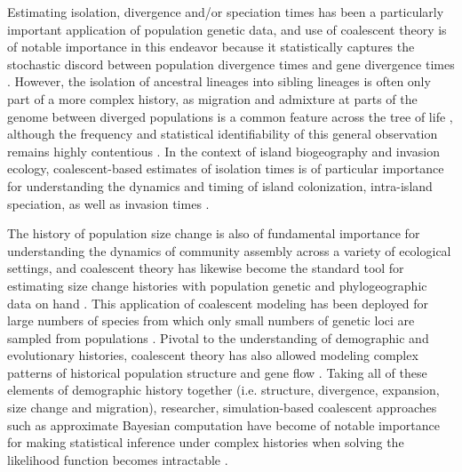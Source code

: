 \documentclass[12pt]{article}
\begin{document}
Estimating isolation, divergence and/or speciation times has been a
particularly important application of population genetic data, and use
of coalescent theory is of notable importance in this endeavor because
it statistically captures the stochastic discord between population
divergence times and gene divergence times \citep{Charlesworth2010-hn,
  Edwards2000-cs}. However, the isolation of ancestral lineages into
sibling lineages is often only part of a more complex history, as
migration and admixture at parts of the genome between diverged
populations is a common feature across the tree of life
\citep{Shapiro2016-rx, Mallet2016-iu, Sousa2013-ox, Nosil2008-km},
although the frequency and statistical identifiability of this general
observation remains highly contentious \citep{Cruickshank2014-bp,
  Yang2017-xy}. In the context of island biogeography and invasion
ecology, coalescent-based estimates of isolation times is of
particular importance for understanding the dynamics and timing of
island colonization, intra-island speciation, as well as invasion
times \citep{Estoup2003-ny, Estoup2004-cy, Hickerson2008-da,
  Gray2014-kp}.

The history of population size change is also of fundamental
importance for understanding the dynamics of community assembly across
a variety of ecological settings, and coalescent theory has likewise
become the standard tool for estimating size change histories with
population genetic and phylogeographic data on hand
\citep{Kuhner1998-dp, Slatkin1991-ec}. This application of coalescent
modeling has been deployed for large numbers of species from which
only small numbers of genetic loci are sampled from populations
\citep{Drummond2005-zh}.
%
%
Pivotal to the understanding of demographic
and evolutionary histories, coalescent theory has also allowed
modeling complex patterns of historical population structure
\citep{Prado-Martinez2013-hv, Bahlo2000-cx} and gene flow
\citep{Beerli2001-mt,Hey2004-xe}.
%
%
Taking all of these elements of demographic
history together (i.e. structure, divergence, expansion, size change
and migration), researcher, simulation-based coalescent approaches
such as approximate Bayesian computation \citep{Beaumont2010-to,
  Pritchard1999-zf} have become of notable importance for making
statistical inference under complex histories when solving the
likelihood function becomes intractable \citep{Sunnaker2013-ts}.
\end{document}
